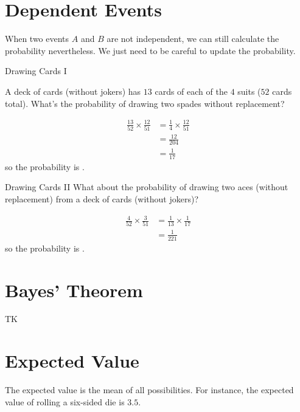 \documentclass[a4paper,10pt]{report}
\begin{document}
\section{Dependent Events}

When two events $A$ and $B$ are not independent, we can still calculate the
probability nevertheless. We just need to be careful to update the probability.

\begin{problem}{Drawing Cards I}

 A deck of cards (without jokers) has $13$ cards of each of the $4$ suits ($52$
 cards total). What's the probability of drawing two spades without replacement?

 \begin{solution}
  \begin{align*}
   \frac{13}{52} \times \frac{12}{51}
   &= \frac{1}{4} \times \frac{12}{51} \\
   &= \frac{12}{204} \\
   &= \frac{1}{17}
  \end{align*}
  so the probability is .
 \end{solution}

\end{problem}

\begin{problem}{Drawing Cards II}
 What about the probability of drawing two aces (without replacement) from a
 deck of cards (without jokers)?

 \begin{solution}
  \begin{align*}
   \frac{4}{52} \times \frac{3}{51}
   &= \frac{1}{13} \times \frac{1}{17} \\
   &= \frac{1}{221}
  \end{align*}
  so the probability is .
 \end{solution}
\end{problem}

\section{Bayes' Theorem}

TK

\section{Expected Value}

The expected value is the mean of all possibilities. For instance, the expected
value of rolling a six-sided die is $3.5$.
\end{document}
